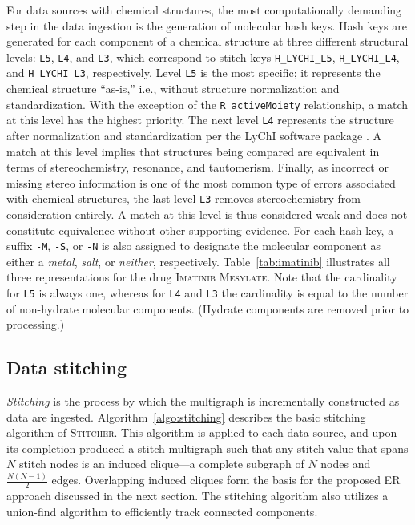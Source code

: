 \documentclass{bmcart}
\newcommand\st{\textsc{Stitcher}}
\begin{document}
For data sources with chemical structures, the most computationally
demanding step in the data ingestion is the generation of molecular hash
keys. Hash keys are generated for each component of a chemical
structure at three different structural levels: 
\texttt{L5}, \texttt{L4}, and \texttt{L3}, which correspond to
stitch keys \texttt{H\_LYCHI\_L5}, \texttt{H\_LYCHI\_L4},
and \texttt{H\_LYCHI\_L3}, respectively. Level \texttt{L5} is the most
specific; it represents the chemical structure ``as-is,'' i.e., without
structure normalization and standardization. With the exception of the
\texttt{R\_activeMoiety} relationship, a match at this level has the highest
priority. The next level \texttt{L4} represents the structure after 
normalization and standardization per the LyChI software package \cite{lychi}. 
A match at this level implies that structures being compared are equivalent 
in terms of stereochemistry, resonance, and tautomerism. Finally, as incorrect 
or missing stereo information is one of the most common type of errors 
associated with chemical structures, the last level \texttt{L3} removes 
stereochemistry from consideration entirely. A match at this level is thus 
considered weak and does not constitute equivalence without other
supporting evidence. For each hash key, a suffix \texttt{-M},
\texttt{-S}, or \texttt{-N} is also assigned to designate the
molecular component as either a \emph{metal}, \emph{salt}, or
\emph{neither}, respectively. Table~\ref{tab:imatinib} illustrates all
three representations for the drug \textsc{Imatinib Mesylate}. Note
that the cardinality for \texttt{L5} is always one, whereas for
\texttt{L4} and \texttt{L3} the cardinality is equal to the number of
non-hydrate molecular components. (Hydrate components are removed
prior to processing.) 

\subsection*{Data stitching}
\emph{Stitching} is the process by which the multigraph is
incrementally constructed as data are ingested.
Algorithm~\ref{algo:stitching} describes the basic stitching algorithm 
of \st. This algorithm is applied to each data source, and upon its
completion produced a stitch multigraph such that any stitch value
that spans $N$ stitch nodes is an induced clique---a complete
subgraph of $N$ nodes and $\frac{N(N-1)}{2}$ edges. Overlapping
induced cliques form the basis for the proposed ER approach discussed 
in the next section. The stitching algorithm also utilizes a union-find
algorithm \cite{Cormen2001} to efficiently track connected components. 
\end{document}
